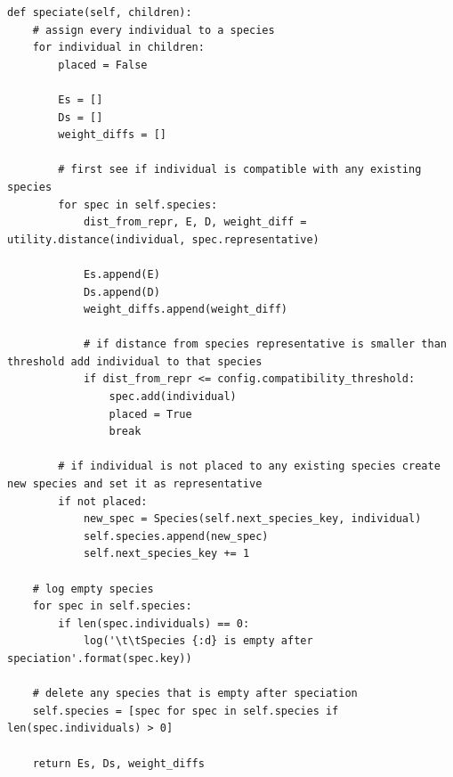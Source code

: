 \documentclass[times, utf8, diplomski, numeric]{fer}
\begin{document}
\begin{lstlisting}[frame=single, label=kod5, caption=Izvorni tekst metode \textit{speciate} u klasi \textit{Population}]
def speciate(self, children):
	# assign every individual to a species
	for individual in children:
		placed = False

		Es = []
		Ds = []
		weight_diffs = []

		# first see if individual is compatible with any existing species
		for spec in self.species:
			dist_from_repr, E, D, weight_diff = utility.distance(individual, spec.representative)

			Es.append(E)
			Ds.append(D)
			weight_diffs.append(weight_diff)

			# if distance from species representative is smaller than threshold add individual to that species
			if dist_from_repr <= config.compatibility_threshold:
				spec.add(individual)
				placed = True
				break

		# if individual is not placed to any existing species create new species and set it as representative
		if not placed:
			new_spec = Species(self.next_species_key, individual)
			self.species.append(new_spec)
			self.next_species_key += 1

	# log empty species
	for spec in self.species:
		if len(spec.individuals) == 0:
			log('\t\tSpecies {:d} is empty after speciation'.format(spec.key))

	# delete any species that is empty after speciation
	self.species = [spec for spec in self.species if len(spec.individuals) > 0]

	return Es, Ds, weight_diffs
\end{lstlisting}
\end{document}
